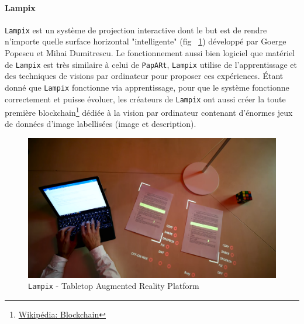 \paragraph{Lampix} \texttt{Lampix} est un système de projection interactive dont le but est de rendre n'importe quelle surface horizontal "intelligente" (fig ~\ref{fig:lampix}) développé par Goerge Popescu et Mihai Dumitrescu. Le fonctionnement aussi bien logiciel que matériel de \texttt{Lampix} est très similaire à celui de \texttt{\texttt{PapARt}}, \texttt{Lampix} utilise de l'apprentissage et des techniques de visions par ordinateur pour proposer ces expériences. Étant donné que \texttt{Lampix} fonctionne via apprentissage, pour que le système fonctionne correctement et puisse évoluer, les créateurs de \texttt{Lampix} ont aussi créer la toute première blockchain\footnote{\href{https://fr.wikipedia.org/wiki/Blockchain}{Wikipédia: Blockchain}} dédiée à la vision par ordinateur contenant d'énormes jeux de données d'image labellisées (image et description).
     

\begin{figure}[H]
\centering
\includegraphics[width=0.7\linewidth]{images/lampix}
\caption{\texttt{Lampix} - Tabletop Augmented Reality Platform}
\label{fig:lampix}
\end{figure} 